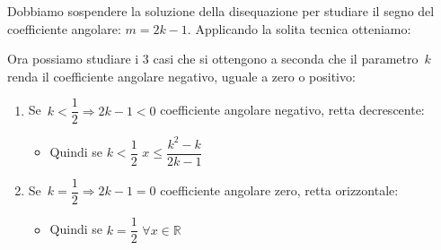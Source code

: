 
Dobbiamo sospendere la soluzione della disequazione per studiare il segno 
del coefficiente angolare: \(m = 2k -1\). 
Applicando la solita tecnica otteniamo:

\hspace*{-5mm} 

Ora possiamo studiare i 3 casi che si ottengono a seconda che il 
parametro~\(k\) renda il coefficiente angolare negativo, uguale a zero 
o positivo:

\begin{enumerate}
\item Se~\(k < \dfrac{1}{2} \Rightarrow 2 k - 1 < 0\)
coefficiente angolare negativo, retta decrescente:

\vspace{-.5em} \hspace*{-5mm} 

\vspace{-2em}
\begin{itemize} [nosep]
\item 
Quindi se \quad \(k < \dfrac{1}{2}\) \qquad 
{}
\qquad \(x \leqslant \dfrac{k^2 - k}{2 k - 1}\)
\end{itemize}

\item Se~\(k = \dfrac{1}{2} \Rightarrow 2 k - 1 = 0\)
coefficiente angolare zero, retta orizzontale:

\vspace{-.5em} \hspace*{-5mm} 

\vspace{-1em}
\begin{itemize} [nosep]
\item 
Quindi se \quad \(k = \dfrac{1}{2}\) \qquad 
{}
\qquad \(\forall x \in \mathbb{R}\)
\end{itemize}


\end{enumerate}
